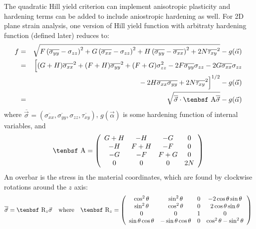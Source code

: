 \documentclass[11pt]{article}
\def\A{\hbox{\tenbsf A}}
\def\R{\hbox{\tenbsf R}}
\def\s#1{\sigma_{#1}}
\def\t#1{\tau_{#1}}
\begin{document}
The quadratic Hill yield criterion can implement anisotropic plasticity and hardening terms can be added to include aniostropic hardening as well. For 2D plane strain analysis, one version of Hill yield function with arbitraty hardening function (defined later) reduces to:
\begin{eqnarray}
          f & = & \sqrt{F\left(\overline{\s{yy}}- \s{zz}\right)^2 + G\left(\overline{\s{xx}}- \s{zz}\right)^2
               + H\left(\overline{\s{yy}}- \overline{\s{xx}}\right)^2
                 +2N\overline{\t{xy}}^2}
                  - g(\vec\alpha) \\
             & = & \Bigl[(G+H)\overline{\s{xx}}^2  + (F+H)\overline{\s{yy}}^2 + (F+G)\s{zz}^2
                   -2F \overline{\s{yy}}\s{zz} - 2G \overline{\s{xx}}\s{zz}
 \nonumber\\
 &&\qquad\mbox{}
                    - 2H \overline{\s{xx}}\overline{\s{yy}}
                   +2N\overline{\t{xy}}^2\Bigr]^{1/2}  - g(\vec\alpha) \\
             & = & \sqrt{\overline{\vec\s{}} \cdot \A \overline{\vec\s{}}} - g(\vec\alpha)
\end{eqnarray}
where $\overline{\vec\s{}} = (\overline{\s{xx}}, \overline{\s{yy}}, \s{zz}, \overline{\t{xy}})$, $g(\vec\alpha)$ is some hardening function of internal variables, and
\begin{equation}
      \A = \left( \begin{array}{cccc}
                       G+H & -H & -G & 0 \\
                       -H & F+H & -F & 0 \\
                       -G & -F & F+G & 0 \\
                       0 & 0 & 0 & 2N
                       \end{array} \right)
\end{equation}
An overbar is the stress in the material coordinates, which are found by clockwise rotations around the $z$ axis:
\begin{equation}
      \overline{\vec\s{}} = \R_z\vec\s{}  \quad{\rm where}\quad \R_z = \left( \begin{array}{cccc}
                       \cos^2\theta & \sin^2\theta & 0 & -2\cos\theta\sin\theta \\
                       \sin^2\theta & \cos^2\theta & 0 & 2\cos\theta\sin\theta \\
                       0 & 0 & 1 & 0 \\
                       \sin\theta\cos\theta & -\sin\theta\cos\theta & 0 & \cos^2\theta - \sin^2\theta
                       \end{array} \right)
\end{equation}
\end{document}
